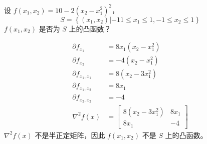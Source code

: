 \begin{problem}
    设 $f(x_1, x_2) = 10 - 2(x_2 - x_1^2)^2$，
    \[S = \left\{(x_1, x_2) | -11 \le x_1 \le 1, -1\le x_2 \le 1\right\}\]
    $f(x_1, x_2)$ 是否为 $S$ 上的凸函数？
\end{problem}
\begin{solution}
    \begin{align*}
        \partial f_{x_1} &= 8x_1(x_2 - x_1^2)\\
        \partial f_{x_2} &= -4(x_2 - x_1^2)\\
        \partial f_{x_1, x_1} &= 8(x_2 - 3x_1^2)\\
        \partial f_{x_1, x_2} &= 8x_1\\
        \partial f_{x_2, x_2} &= -4\\
        \nabla^2f(x) &= \begin{bmatrix}
            8(x_2 - 3x_1^2) & 8x_1 \\
            8x_1 & -4
        \end{bmatrix}
    \end{align*}
    $\nabla^2f(x)$ 不是半正定矩阵，因此 $f(x_1, x_2)$ 不是 $S$ 上的凸函数。
\end{solution}

